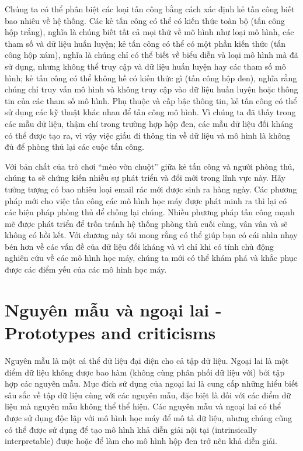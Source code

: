 Chúng ta có thể phân biệt các loại tấn công bằng cách xác định kẻ tấn công biết bao nhiêu về hệ thống. Các kẻ tấn công có thể có kiến thức toàn bộ (tấn công hộp trắng), nghĩa là chúng biết tất cả mọi thứ về mô hình như loại mô hình, các tham số và dữ liệu huấn luyện; kẻ tấn công có thể có một phần kiến thức (tấn công hộp xám), nghĩa là chúng chỉ có thể biết về biểu diễn và loại mô hình mà đã sử dụng, nhưng không thể truy cập và dữ liệu huấn luyện hay các tham số mô hình; kẻ tấn công có thể không hề có kiến thức gì (tấn công hộp đen), nghĩa rằng chúng chỉ truy vấn mô hình và không truy cập vào dữ liệu huấn luyện hoặc thông tin của các tham số mô hình. Phụ thuộc và cấp bậc thông tin, kẻ tấn công có thể sử dụng các kỹ thuật khác nhau để tấn công mô hình. Vì chúng ta đã thấy trong các mẫu dữ liệu, thậm chí trong trường hợp hộp đen, các mẫu dữ liệu đối kháng có thể được tạo ra, vì vậy việc giấu đi thông tin về dữ liệu và mô hình là không đủ để phòng thủ lại các cuộc tấn công.

Với bản chất của trò chơi ``mèo vờn chuột'' giữa kẻ tấn công và người phòng thủ, chúng ta sẽ chứng kiến nhiều sự phát triển và đổi mới trong lĩnh vực này. Hãy tưởng tượng có bao nhiêu loại email rác mới được sinh ra hàng ngày. Các phương pháp mới cho việc tấn công các mô hình học máy được phát minh ra thì lại có các biện pháp phòng thủ để chống lại chúng. Nhiều phương pháp tấn công mạnh mẽ được phát triển để trốn tránh hệ thống phòng thủ cuối cùng, vân vân và sẽ không có hồi kết. Với chương này tôi mong rằng có thể giúp bạn có cái nhìn nhạy bén hơn về các vấn đề của dữ liệu đối kháng và vì chỉ khi có tính chủ động nghiên cứu về các mô hình học máy, chúng ta mới có thể khám phá và khắc phục được các điểm yếu của các mô hình học máy.
\clearpage
\section{Nguyên mẫu và ngoại lai - Prototypes and criticisms}

Nguyên mẫu là một cá thể dữ liệu đại diện cho cả tập dữ liệu. Ngoại lai là một điểm dữ liệu không được bao hàm (không cùng phân phối dữ liệu với) bởi tập hợp các nguyên mẫu. Mục đích sử dụng của ngoại lai là cung cấp những hiểu biết sâu sắc về tập dữ liệu cùng với các nguyên mẫu, đặc biệt là đối với các điểm dữ liệu mà nguyên mẫu không thể thể hiện. Các nguyên mẫu và ngoại lai có thể được sử dụng độc lập với mô hình học máy để mô tả dữ liệu, nhưng chúng cũng có thể được sử dụng để tạo mô hình khả diễn giải nội tại (intrinsically interpretable) được hoặc để làm cho mô hình hộp đen trở nên khả diễn giải.

